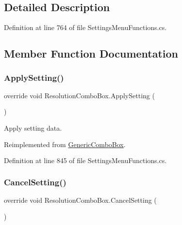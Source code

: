 \subsection{Detailed Description}


Definition at line 764 of file Settings\+Menu\+Functions.\+cs.



\subsection{Member Function Documentation}
\mbox{\label{class_resolution_combo_box_ae2069c493be08045148b0e260b2112c9}} 
\subsubsection{\texorpdfstring{Apply\+Setting()}{ApplySetting()}}
{\footnotesize\ttfamily override void Resolution\+Combo\+Box.\+Apply\+Setting (\begin{DoxyParamCaption}{ }\end{DoxyParamCaption})\hspace{0.3cm}{\ttfamily [virtual]}}



Apply setting data. 



Reimplemented from \hyperlink{class_generic_combo_box_a5aced71f035bd463a4ebaaffe19ec547}{Generic\+Combo\+Box}.



Definition at line 845 of file Settings\+Menu\+Functions.\+cs.

\mbox{\label{class_resolution_combo_box_a0c831260eeb5fe60b9cb655693af4fa2}} 
\subsubsection{\texorpdfstring{Cancel\+Setting()}{CancelSetting()}}
{\footnotesize\ttfamily override void Resolution\+Combo\+Box.\+Cancel\+Setting (\begin{DoxyParamCaption}{ }\end{DoxyParamCaption})\hspace{0.3cm}{\ttfamily [virtual]}}



